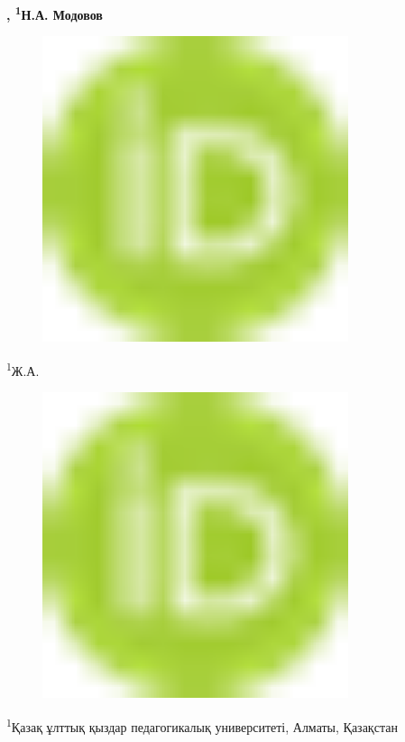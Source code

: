 {\bfseries , \textsuperscript{1}Н.А. Модовов}
\begin{figure}[H]
	\centering
	\includegraphics[width=0.8\textwidth]{media/ict/image1}
	\caption*{}
\end{figure}

\textsuperscript{1}Ж.А.
\begin{figure}[H]
	\centering
	\includegraphics[width=0.8\textwidth]{media/ict/image1}
	\caption*{}
\end{figure}


\textsuperscript{1}Қазақ ұлттық қыздар педагогикалық университеті,
Алматы, Қазақстан

